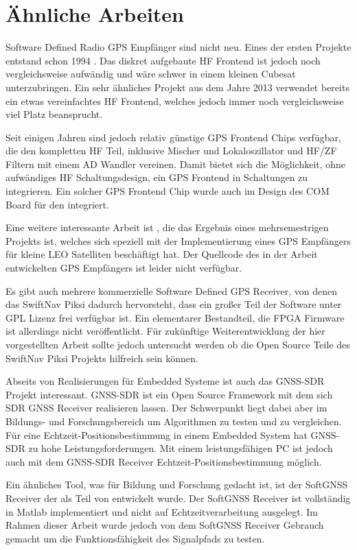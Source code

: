 \section{Ähnliche Arbeiten}
Software Defined Radio GPS Empfänger sind nicht neu. Eines der ersten Projekte entstand schon 1994 \cite{vidmar1994diy}. Das diskret aufgebaute HF Frontend ist jedoch noch vergleichsweise aufwändig und wäre schwer in einem kleinen Cubesat unterzubringen. Ein sehr ähnliches Projekt aus dem Jahre 2013 \cite{A_holme_2013} verwendet bereits ein etwas vereinfachtes HF Frontend, welches jedoch immer noch vergleichsweise viel Platz beansprucht.

Seit einigen Jahren sind jedoch relativ günstige GPS Frontend Chips verfügbar, die den kompletten HF Teil, inklusive Mischer und Lokaloszillator und HF/ZF Filtern mit einem AD Wandler vereinen. Damit bietet sich die Möglichkeit, ohne aufwändiges HF Schaltungsdesign, ein GPS Frontend in Schaltungen zu integrieren. Ein solcher GPS Frontend Chip wurde auch im Design des COM Board für den \dscubesat integriert. 

Eine weitere interessante Arbeit ist \cite{Birklykke2010}, die das Ergebnis eines mehrsemestrigen Projekts ist, welches sich speziell mit der Implementierung eines GPS Empfängers für kleine \gls{LEO} Satelliten beschäftigt hat. Der Quellcode des in der Arbeit entwickelten GPS Empfängers ist leider nicht verfügbar.

Es gibt auch mehrere kommerzielle Software Defined GPS Receiver, von denen das SwiftNav Piksi \cite{SwiftNavPiksi} dadurch hervorsteht, dass ein großer Teil der Software unter GPL Lizenz frei verfügbar ist. Ein elementarer Bestandteil, die FPGA Firmware ist allerdings nicht veröffentlicht. Für zukünftige Weiterentwicklung der hier vorgestellten Arbeit sollte jedoch untersucht werden ob die Open Source Teile des SwiftNav Piksi Projekts hilfreich sein können.

Abseits von Realisierungen für Embedded Systeme ist auch das GNSS-SDR Projekt \cite{gnss-sdr} interessant. GNSS-SDR ist ein Open Source Framework mit dem sich SDR GNSS Receiver realisieren lassen. Der Schwerpunkt liegt dabei aber im Bildungs- und Forschungsbereich um Algorithmen zu testen und zu vergleichen. Für eine Echtzeit-Positionsbestimmung in einem Embedded System hat GNSS-SDR zu hohe Leistungsforderungen. Mit einem leistungsfähigen PC ist jedoch auch mit dem GNSS-SDR Receiver Echtzeit-Positionsbestimmung möglich.

Ein ähnliches Tool, was für Bildung und Forschung gedacht ist, ist der SoftGNSS Receiver der als Teil von \cite{borre2007software} entwickelt wurde. Der SoftGNSS Receiver ist vollständig in Matlab implementiert und nicht auf Echtzeitverarbeitung ausgelegt. Im Rahmen dieser Arbeit wurde jedoch von dem SoftGNSS Receiver Gebrauch gemacht um die Funktionsfähigkeit des Signalpfads zu testen.